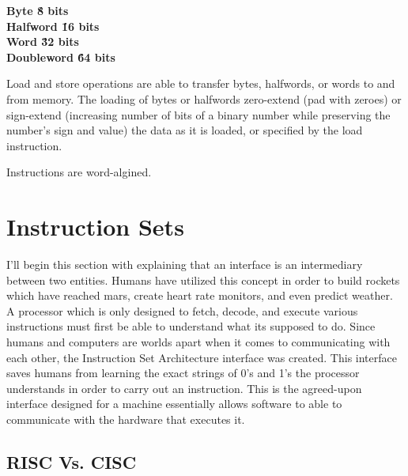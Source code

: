 \documentclass[12pt]{scrreprt}
\begin{document}
	\begin{center}
		\bfseries Byte \' 8 bits\\
		\bfseries Halfword \' 16 bits\\
		\bfseries Word \' 32 bits\\
		\bfseries Doubleword \' 64 bits\\
	\end{center}

	Load and store operations are able to transfer bytes, halfwords, or words to and from memory. The loading of bytes or halfwords zero-extend
	(pad with zeroes) or sign-extend (increasing number of bits of a binary number while preserving the number's sign and value) the data as it is loaded, or specified by the load instruction.

	Instructions are word-algined.


{\let\clearpage\relax\chapter{Instruction Sets}}

	I'll begin this section with explaining that an interface is an intermediary between two entities. Humans have utilized this concept in order to build rockets which have reached mars, create heart rate monitors, and even predict weather. A processor which is only designed to fetch, decode, and execute various instructions must first be able to understand what its supposed to do. Since humans and computers are worlds apart when it comes to communicating with each other, the Instruction Set Architecture interface was created. This interface saves humans from learning the exact strings of 0's and 1's the processor understands in order to carry out an instruction.
	This is the agreed-upon interface designed for a machine essentially allows software to able to communicate with the hardware that executes it.

	\section{RISC Vs. CISC}
\end{document}
